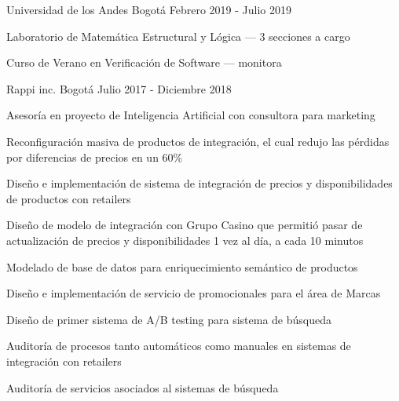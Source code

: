 


\begin{cventries}
  {Universidad de los Andes}
  {Bogotá}
  {Febrero 2019 - Julio 2019}
  {
    \begin{cvitems}
    \item{Laboratorio de Matemática Estructural y Lógica --- 3 secciones a cargo}
    \item{Curso de Verano en Verificación de Software --- monitora }
    \end{cvitems}
  }

  {Rappi inc.} %
  {Bogotá} %
  {Julio 2017 - Diciembre 2018} %
  {
    \begin{cvitems}
    \item{Asesoría en proyecto de Inteligencia Artificial con consultora para marketing}
    \item{Reconfiguración masiva de productos de integración, el cual redujo las pérdidas por diferencias de precios en un 60\%}
    \item{Diseño e implementación de sistema de integración de precios y disponibilidades de productos con retailers}
    \item{Diseño de modelo de integración con Grupo Casino que permitió pasar de actualización de precios y disponibilidades 1 vez al día, a cada 10 minutos}
    \item{Modelado de base de datos para enriquecimiento semántico de productos}
    \item{Diseño e implementación de servicio de promocionales para el área de Marcas}
    \item{Diseño de primer sistema de A/B testing para sistema de búsqueda}
    \item{Auditoría de procesos tanto automáticos como manuales en sistemas de integración con retailers}
    \item{Auditoría de servicios asociados al sistemas de búsqueda}
   \end{cvitems}
  } %



\end{cventries}

